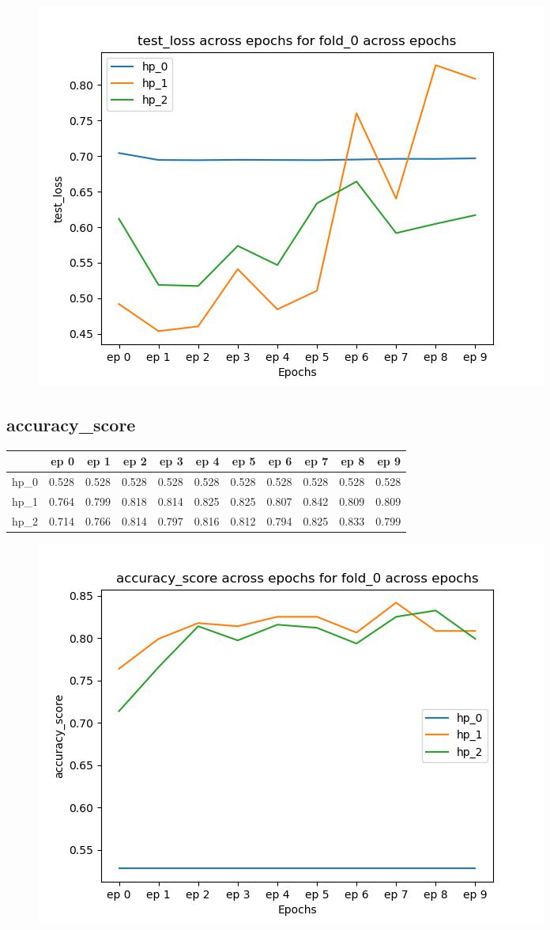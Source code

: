 \documentclass{article}
\begin{document}
\begin{figure}[H]
\includegraphics[scale = 0.75]{fold_0/test_loss}
\end{figure}
\subsection{accuracy\_score}
\begin{tabular}{lrrrrrrrrrr}
\toprule
{} &   ep 0 &   ep 1 &   ep 2 &   ep 3 &   ep 4 &   ep 5 &   ep 6 &   ep 7 &   ep 8 &   ep 9 \\
\midrule
hp\_0 &  0.528 &  0.528 &  0.528 &  0.528 &  0.528 &  0.528 &  0.528 &  0.528 &  0.528 &  0.528 \\
hp\_1 &  0.764 &  0.799 &  0.818 &  0.814 &  0.825 &  0.825 &  0.807 &  0.842 &  0.809 &  0.809 \\
hp\_2 &  0.714 &  0.766 &  0.814 &  0.797 &  0.816 &  0.812 &  0.794 &  0.825 &  0.833 &  0.799 \\
\bottomrule
\end{tabular}

\begin{figure}[H]
\includegraphics[scale = 0.75]{fold_0/accuracy_score}
\end{figure}
\end{document}
